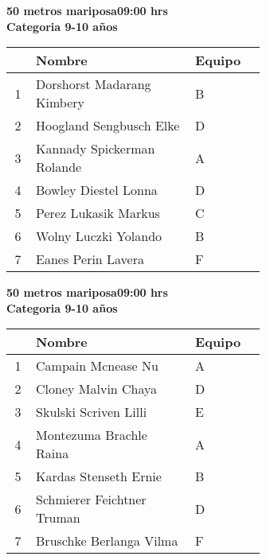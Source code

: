 \begin{minipage}{0.95\linewidth}\vspace{0.5cm} 
\begin{flushleft}
\textbf{
\hspace{-0.15cm}50 metros mariposa\hspace{1.5cm}09:00 hrs \\Categoria 9-10 años}\vspace{-0.2cm} 
\end{flushleft}
\begin{tabular}{cp{0.63\linewidth}l}
\hline
& \textbf{Nombre} & \textbf{Equipo} \\ \hline
1 & Dorshorst Madarang Kimbery & B \\ 
2 & Hoogland Sengbusch Elke & D \\ 
3 & Kannady Spickerman Rolande & A \\ 
4 & Bowley Diestel Lonna & D \\ 
5 & Perez Lukasik Markus & C \\ 
6 & Wolny Luczki Yolando & B \\ 
7 & Eanes Perin Lavera & F \\ 
\end{tabular}
\end{minipage}
\begin{minipage}{0.95\linewidth}\vspace{0.5cm} 
\begin{flushleft}
\textbf{
\hspace{-0.15cm}50 metros mariposa\hspace{1.5cm}09:00 hrs \\Categoria 9-10 años}\vspace{-0.2cm} 
\end{flushleft}
\begin{tabular}{cp{0.63\linewidth}l}
\hline
& \textbf{Nombre} & \textbf{Equipo} \\ \hline
1 & Campain Mcnease Nu & A \\ 
2 & Cloney Malvin Chaya & D \\ 
3 & Skulski Scriven Lilli & E \\ 
4 & Montezuma Brachle Raina & A \\ 
5 & Kardas Stenseth Ernie & B \\ 
6 & Schmierer Feichtner Truman & D \\ 
7 & Bruschke Berlanga Vilma & F \\ 
\end{tabular}
\end{minipage}

